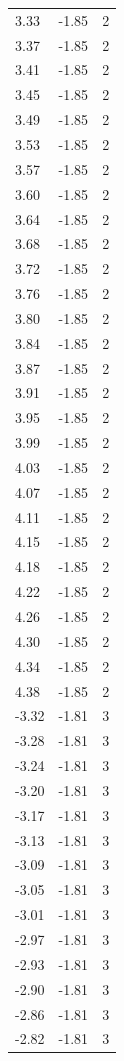 \begin{longtable}{lrr}
  3.33 & -1.85 & 2 \\
  3.37 & -1.85 & 2 \\
  3.41 & -1.85 & 2 \\
  3.45 & -1.85 & 2 \\
  3.49 & -1.85 & 2 \\
  3.53 & -1.85 & 2 \\
  3.57 & -1.85 & 2 \\
  3.60 & -1.85 & 2 \\
  3.64 & -1.85 & 2 \\
  3.68 & -1.85 & 2 \\
  3.72 & -1.85 & 2 \\
  3.76 & -1.85 & 2 \\
  3.80 & -1.85 & 2 \\
  3.84 & -1.85 & 2 \\
  3.87 & -1.85 & 2 \\
  3.91 & -1.85 & 2 \\
  3.95 & -1.85 & 2 \\
  3.99 & -1.85 & 2 \\
  4.03 & -1.85 & 2 \\
  4.07 & -1.85 & 2 \\
  4.11 & -1.85 & 2 \\
  4.15 & -1.85 & 2 \\
  4.18 & -1.85 & 2 \\
  4.22 & -1.85 & 2 \\
  4.26 & -1.85 & 2 \\
  4.30 & -1.85 & 2 \\
  4.34 & -1.85 & 2 \\
  4.38 & -1.85 & 2 \\
  -3.32 & -1.81 & 3 \\
  -3.28 & -1.81 & 3 \\
  -3.24 & -1.81 & 3 \\
  -3.20 & -1.81 & 3 \\
  -3.17 & -1.81 & 3 \\
  -3.13 & -1.81 & 3 \\
  -3.09 & -1.81 & 3 \\
  -3.05 & -1.81 & 3 \\
  -3.01 & -1.81 & 3 \\
  -2.97 & -1.81 & 3 \\
  -2.93 & -1.81 & 3 \\
  -2.90 & -1.81 & 3 \\
  -2.86 & -1.81 & 3 \\
  -2.82 & -1.81 & 3 \\

\end{longtable}
